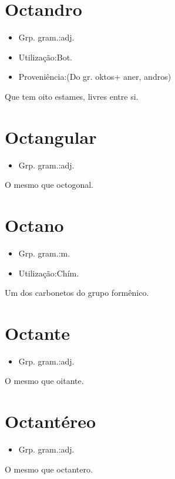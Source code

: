 \section{Octandro}
\begin{itemize}
\item {Grp. gram.:adj.}
\end{itemize}
\begin{itemize}
\item {Utilização:Bot.}
\end{itemize}
\begin{itemize}
\item {Proveniência:(Do gr. \textunderscore oktos\textunderscore  + \textunderscore aner\textunderscore , \textunderscore andros\textunderscore )}
\end{itemize}
Que tem oito estames, livres entre si.
\section{Octangular}
\begin{itemize}
\item {Grp. gram.:adj.}
\end{itemize}
O mesmo que \textunderscore octogonal\textunderscore .
\section{Octano}
\begin{itemize}
\item {Grp. gram.:m.}
\end{itemize}
\begin{itemize}
\item {Utilização:Chím.}
\end{itemize}
Um dos carbonetos do grupo formênico.
\section{Octante}
\begin{itemize}
\item {Grp. gram.:adj.}
\end{itemize}
O mesmo que \textunderscore oitante\textunderscore .
\section{Octantéreo}
\begin{itemize}
\item {Grp. gram.:adj.}
\end{itemize}
O mesmo que \textunderscore octantero\textunderscore .
